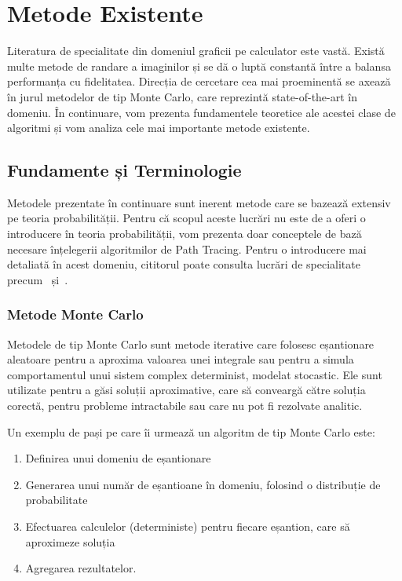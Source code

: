 \documentclass[12pt,a4paper]{report}
\newtheorem{definition}{Definiția}
\numberwithin{equation}{section} %
\begin{document}
\chapter{\label{sec:stateoftheart}Metode Existente}

Literatura de specialitate din domeniul graficii pe calculator este vastă. Există
multe metode de randare a imaginilor și se dă o luptă constantă între a balansa
performanța cu fidelitatea. Direcția de cercetare cea mai proeminentă se axează
în jurul metodelor de tip Monte Carlo, care reprezintă state-of-the-art în
domeniu. În continuare, vom prezenta fundamentele teoretice ale acestei clase de
algoritmi și vom analiza cele mai importante metode existente.

\section{Fundamente și Terminologie}

Metodele prezentate în continuare sunt inerent metode care se bazează extensiv
pe teoria probabilității. Pentru că scopul aceste lucrări nu este de a oferi o
introducere în teoria probabilității, vom prezenta doar conceptele de bază necesare
înțelegerii algoritmilor de Path Tracing. Pentru o introducere mai detaliată în
acest domeniu, cititorul poate consulta lucrări de specialitate precum~\cite{Halton}
și~\cite{Hammersley}.



\subsection{Metode Monte Carlo}

Metodele de tip Monte Carlo sunt metode
iterative care folosesc eșantionare aleatoare pentru a aproxima valoarea unei
integrale sau pentru a simula comportamentul unui sistem complex determinist,
modelat stocastic. Ele sunt utilizate pentru a găsi soluții aproximative, care
să conveargă către soluția corectă, pentru probleme intractabile sau care nu pot
fi rezolvate analitic.

Un exemplu de pași pe care îi urmează un algoritm de tip Monte Carlo este:
\begin{enumerate}
	\item Definirea unui domeniu de eșantionare
	\item Generarea unui număr de eșantioane în domeniu, folosind o distribuție de probabilitate
	\item Efectuarea calculelor (deterministe) pentru fiecare eșantion, care să aproximeze soluția
	\item Agregarea rezultatelor.
\end{enumerate}
\end{document}
